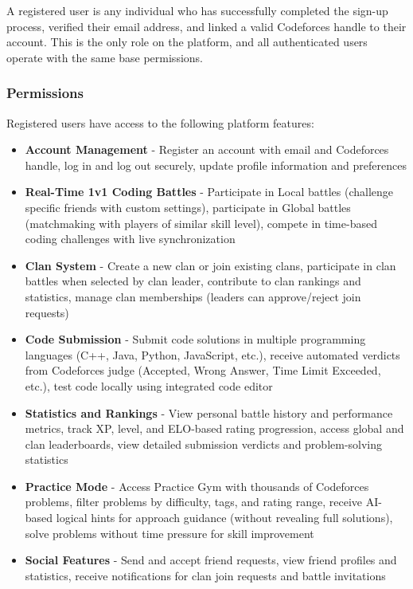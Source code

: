 \documentclass[12pt]{article}
\begin{document}
A registered user is any individual who has successfully completed the sign-up process, verified their email address, and linked a valid Codeforces handle to their account. This is the only role on the platform, and all authenticated users operate with the same base permissions.

\subsubsection{Permissions}

Registered users have access to the following platform features:

\begin{itemize}
\item \textbf{Account Management} - Register an account with email and Codeforces handle, log in and log out securely, update profile information and preferences

\item \textbf{Real-Time 1v1 Coding Battles} - Participate in Local battles (challenge specific friends with custom settings), participate in Global battles (matchmaking with players of similar skill level), compete in time-based coding challenges with live synchronization

\item \textbf{Clan System} - Create a new clan or join existing clans, participate in clan battles when selected by clan leader, contribute to clan rankings and statistics, manage clan memberships (leaders can approve/reject join requests)

\item \textbf{Code Submission} - Submit code solutions in multiple programming languages (C++, Java, Python, JavaScript, etc.), receive automated verdicts from Codeforces judge (Accepted, Wrong Answer, Time Limit Exceeded, etc.), test code locally using integrated code editor

\item \textbf{Statistics and Rankings} - View personal battle history and performance metrics, track XP, level, and ELO-based rating progression, access global and clan leaderboards, view detailed submission verdicts and problem-solving statistics

\item \textbf{Practice Mode} - Access Practice Gym with thousands of Codeforces problems, filter problems by difficulty, tags, and rating range, receive AI-based logical hints for approach guidance (without revealing full solutions), solve problems without time pressure for skill improvement

\item \textbf{Social Features} - Send and accept friend requests, view friend profiles and statistics, receive notifications for clan join requests and battle invitations
\end{itemize}
\end{document}
